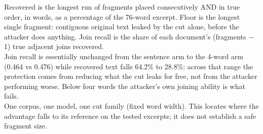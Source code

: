 \begin{table}[t]
\begin{flushleft}
Recovered is the longest run of fragments placed consecutively AND in true order, in words, as a percentage of the 76-word excerpt. Floor is the longest single fragment: contiguous original text leaked by the cut alone, before the attacker does anything. Join recall is the share of each document's (fragments $-$ 1) true adjacent joins recovered.\\
Join recall is essentially unchanged from the sentence arm to the 4-word arm (0.464 vs 0.476) while recovered text falls 64.2\% to 28.8\%: across that range the protection comes from reducing what the cut leaks for free, not from the attacker performing worse. Below four words the attacker's own joining ability is what fails.\\
One corpus, one model, one cut family (fixed word width). This locates where the advantage falls to its reference on the tested excerpts; it does not establish a safe fragment size.\\
\end{flushleft}
\end{table}
